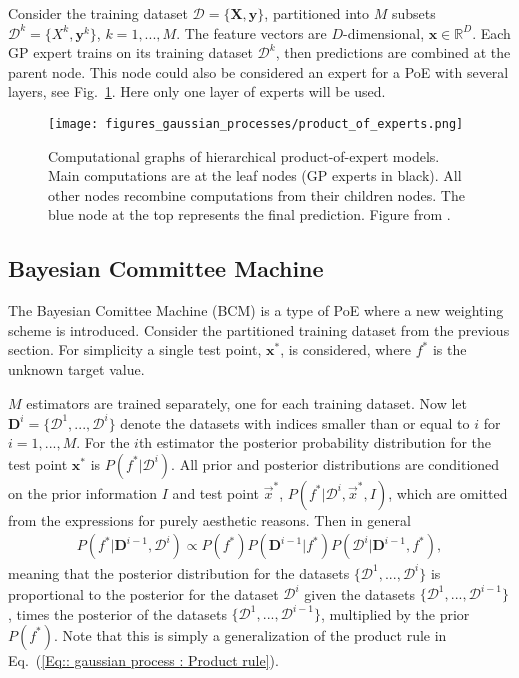 \documentclass[twoside,english]{uiofysmaster}
\begin{document}
{{Consider the training dataset $\mathcal{D} = \{ \textbf{X}, \textbf{y}\}$, partitioned into $M$ subsets $\mathcal{D}^k = \{X^k, \textbf{y}^k \}$, $k = 1,...,M$. The feature vectors are $D$-dimensional, $\textbf{x} \in \mathbb{R}^D$. Each GP expert trains on its training dataset $\mathcal{D}^k$, then predictions are combined at the parent node. This node could also be considered an expert for a PoE with several layers, see Fig.~\ref{Fig:: gaussian process : DGP illustration of layers}. Here only one layer of experts will be used. 

\begin{figure}
\texttt{[image: figures\_gaussian\_processes/product\_of\_experts.png]}
\caption{Computational graphs of hierarchical product-of-expert models. Main computations are at the leaf nodes (GP experts in black). All other nodes recombine computations from their children nodes. The blue node at the top represents the final prediction. Figure from \cite{deisenroth2015distributed}.}
\label{Fig:: gaussian process : DGP illustration of layers}
\end{figure}

\subsection{Bayesian Committee Machine}

The Bayesian Comittee Machine (BCM) \cite{tresp2000bayesian} is a type of PoE where a new weighting scheme is introduced. Consider the partitioned training dataset from the previous section. For simplicity a single test point, $\textbf{x}^*$, is considered, where $f^*$ is the unknown target value. 

$M$ estimators are trained separately, one for each training dataset. Now let $\textbf{D}^{i} = \{ \mathcal{D}^1, ..., \mathcal{D}^i \}$ denote the datasets with indices smaller than or equal to $i$ for $i=1,...,M$. For the $i$th estimator the posterior probability distribution for the test point $\textbf{x}^*$ is $P(f^* | \mathcal{D}^{i})$. All prior and posterior distributions are conditioned on the prior information $I$ and test point $\vec{x}^*$, $P(f^* | \mathcal{D}^i, \vec{x}^*, I)$, which are omitted from the expressions for purely aesthetic reasons. Then in general
\begin{align}
P(f^* |  \textbf{D}^{i-1}, \mathcal{D}^i) \propto P(f^*) P(\textbf{D}^{i-1} | f^*) P (\mathcal{D}^i | \textbf{D}^{i-1}, f^*),
\end{align}
meaning that the posterior distribution for the datasets $\{ \mathcal{D}^1,..., \mathcal{D}^i \}$ is proportional to the posterior for the dataset $\mathcal{D}^i$ given the datasets $\{\mathcal{D}^1,..., \mathcal{D}^{i-1} \}$, times the posterior of the datasets $\{ \mathcal{D}^1,..., \mathcal{D}^{i-1}\}$, multiplied by the prior $P(f^*)$. Note that this is simply a generalization of the product rule in Eq.~(\ref{Eq:: gaussian process : Product rule}).

}}
\end{document}
